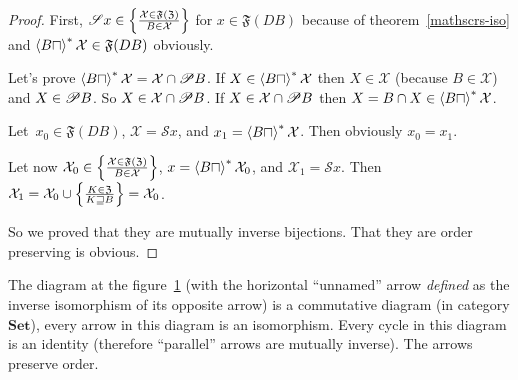 \begin{proof}
First, $\mathscr{S}x\in\left\{ \frac{\mathcal{X}\in\mathfrak{F}(\mathfrak{Z})}{B\in\mathcal{X}}\right\}$ for $x\in\mathfrak{F}(DB)$
because of theorem~\ref{mathscrs-iso} and
$\left\langle B\sqcap\right\rangle ^{\ast}\mathcal{X}\in\mathfrak{F}(DB)$ obviously.

Let's prove
$\left\langle B\sqcap\right\rangle ^{\ast}\mathcal{X}=\mathcal{X}\cap\mathscr{P} B$.
If $X\in\left\langle B\sqcap\right\rangle ^{\ast}\mathcal{X}$ then
$X\in\mathcal{X}$ (because $B\in\mathcal{X}$) and
$X\in\mathscr{P} B$. So $X\in\mathcal{X}\cap\mathscr{P} B$. If
$X\in\mathcal{X}\cap\mathscr{P} B$ then
$X=B\cap X\in\left\langle B\sqcap\right\rangle ^{\ast}\mathcal{X}$.

Let~$x_0\in\mathfrak{F}(DB)$, $\mathcal{X}=\mathscr{S}x$, and
$x_1=\left\langle B\sqcap\right\rangle ^{\ast}\mathcal{X}$. Then obviously $x_0=x_1$.

Let now
$\mathcal{X}_0\in\left\{ \frac{\mathcal{X}\in\mathfrak{F}(\mathfrak{Z})}{B\in\mathcal{X}}\right\}$, $x=\left\langle B\sqcap\right\rangle ^{\ast}\mathcal{X}_0$, and
$\mathcal{X}_1=\mathscr{S}x$. Then
$\mathcal{X}_1=
\mathcal{X}_0\cup\left\{ \frac{K\in\mathfrak{Z}}{K\sqsupseteq B}\right\}=
\mathcal{X}_0$.

So we proved that they are mutually inverse bijections. That
they are order preserving is obvious.
\end{proof}

\begin{thm}\label{powfilt-diag}
The diagram at the figure~\ref{unfix-dia} (with the horizontal ``unnamed''
arrow \emph{defined} as the inverse isomorphism of its opposite arrow)
is a commutative diagram (in category $\mathbf{Set}$), every arrow
in this diagram is an isomorphism. Every cycle in this diagram is
an identity (therefore ``parallel'' arrows are mutually inverse).
The arrows preserve order.

\begin{figure}[ht]
\caption{\label{unfix-dia}}
\end{figure}
\end{thm}

